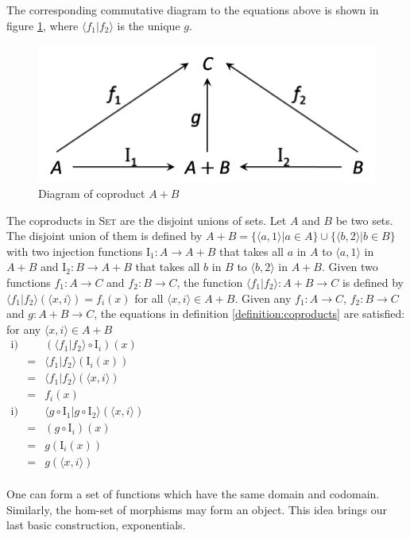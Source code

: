 The corresponding commutative diagram to the equations above is shown in figure \ref{figure:cat_cop}, where $ \langle f_1 | f_2 \rangle $ is the unique $ g $.
\begin{figure}[h!]
\centering
\includegraphics[scale=0.42]{./images/cat_cop}
\caption{Diagram of coproduct $ A+B $}
\label{figure:cat_cop}
\end{figure}

The coproducts in \textsc{Set} are the disjoint unions of sets. Let $ A $ and $ B $ be two sets. The disjoint union of them is defined by $ A+B = \{ \langle a,1 \rangle | a \in A \} \cup \{ \langle b,2 \rangle | b \in B \} $ with two injection functions $ \text{I}_1 : A \to A+B $ that takes all $ a $ in $ A $ to $ \langle a,1 \rangle $ in $ A+B $ and $ \text{I}_2 : B \to A+B $ that takes all $ b $ in $ B $ to $ \langle b,2 \rangle $ in $ A+B $. Given two functions $ f_1 : A \to C $ and $ f_2 : B \to C $, the function $ \langle f_1 | f_2 \rangle : A+B \to C $ is defined by $ \langle f_1 | f_2 \rangle ( \langle x,i \rangle ) = f_i (x) $ for all $ \langle x,i \rangle \in A+B $. Given any $ f_1 : A \to C $, $ f_2 : B \to C $ and $ g: A+B \to C $, the equations in definition \ref{definition:coproducts} are satisfied: for any $ \langle x,i \rangle \in A+B $\\
$
\begin{array}{rll}
\text{i)} & & ( \langle f_1 | f_2 \rangle \circ \text{I}_i )(x)\\
 & = & \langle f_1 | f_2 \rangle ( \text{I}_i (x))\\
 & = & \langle f_1 | f_2 \rangle ( \langle x,i \rangle )\\
 & = & f_i (x)\\
\text{i)} & & \langle g \circ \text{I}_1 | g \circ \text{I}_2 \rangle ( \langle x,i \rangle )\\
 & = & ( g \circ \text{I}_i )(x)\\
 & = & g( \text{I}_i (x) )\\
 & = & g( \langle x,i \rangle )
\end{array}
$
\\
\\
One can form a set of functions which have the same domain and codomain. Similarly, the hom-set of morphisms may form an object. This idea brings our last basic construction, exponentials.

